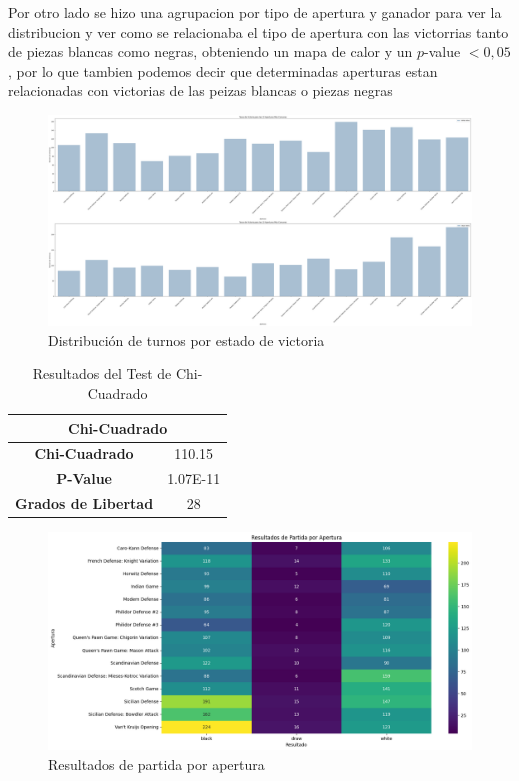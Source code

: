 \documentclass[a4paper, 12pt]{article}
\begin{document}
\vspace{5mm} %

Por otro lado se hizo una agrupacion por tipo de apertura y ganador para ver la distribucion y ver como se relacionaba el tipo de apertura con las victorrias tanto de piezas blancas como negras, obteniendo un mapa de calor y un $p$-value $< 0{,}05$, 
por lo que tambien podemos decir que determinadas aperturas estan relacionadas con victorias de las peizas blancas o piezas negras 


\begin{figure}[H]
    \centering
    \includegraphics[width=\textwidth]{../Imagenes/Hipotesis_2.png}
    \caption{Distribución de turnos por estado de victoria}
    \label{fig:turns_victory_status}
\end{figure}

\begin{table}[h!]
    \centering
    \begin{tabular}{|c|c|}
        \hline
        \multicolumn{2}{|c|}{\textbf{Chi-Cuadrado}} \\ \hline
        \textbf{Chi-Cuadrado} & 110.15 \\ \hline
        \textbf{P-Value} & 1.07E-11 \\ \hline
        \textbf{Grados de Libertad} & 28 \\ \hline
    \end{tabular}
    \caption{Resultados del Test de Chi-Cuadrado}
    \label{table:chi_squared}
\end{table}

\begin{figure}[H]
    \centering
    \includegraphics[width=\textwidth]{../Imagenes/Hipotesis_2_2.png}
    \caption{Resultados de partida por apertura}
    \label{fig:results_opening}
\end{figure}
\end{document}
